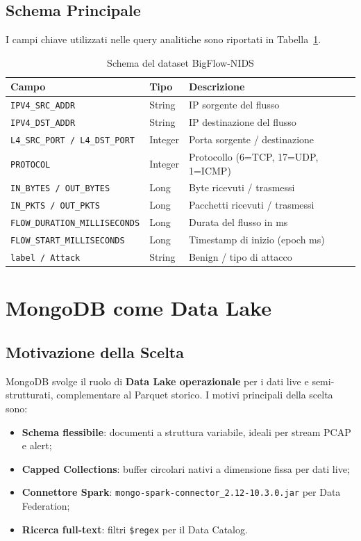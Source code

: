 \documentclass[10pt,a4paper]{article}
\begin{document}
\subsection{Schema Principale}
I campi chiave utilizzati nelle query analitiche sono riportati in
Tabella~\ref{tab:schema}.

\begin{table}[H]
\centering
\small
\begin{tabularx}{\textwidth}{@{}llX@{}}
\toprule
\textbf{Campo} & \textbf{Tipo} & \textbf{Descrizione} \\
\midrule
\texttt{IPV4\_SRC\_ADDR}              & String  & IP sorgente del flusso \\
\texttt{IPV4\_DST\_ADDR}              & String  & IP destinazione del flusso \\
\texttt{L4\_SRC\_PORT / L4\_DST\_PORT}& Integer & Porta sorgente / destinazione \\
\texttt{PROTOCOL}                     & Integer & Protocollo (6=TCP, 17=UDP, 1=ICMP) \\
\texttt{IN\_BYTES / OUT\_BYTES}        & Long    & Byte ricevuti / trasmessi \\
\texttt{IN\_PKTS / OUT\_PKTS}          & Long    & Pacchetti ricevuti / trasmessi \\
\texttt{FLOW\_DURATION\_MILLISECONDS}  & Long    & Durata del flusso in ms \\
\texttt{FLOW\_START\_MILLISECONDS}     & Long    & Timestamp di inizio (epoch ms) \\
\texttt{label / Attack}               & String  & Benign / tipo di attacco \\
\bottomrule
\end{tabularx}
\caption{Schema del dataset BigFlow-NIDS}
\label{tab:schema}
\end{table}

\section{MongoDB come Data Lake}

\subsection{Motivazione della Scelta}
MongoDB svolge il ruolo di \textbf{Data Lake operazionale} per i dati live e semi-strutturati,
complementare al Parquet storico. I motivi principali della scelta sono:
\begin{itemize}[noitemsep]
  \item \textbf{Schema flessibile}: documenti a struttura variabile, ideali per stream PCAP e alert;
  \item \textbf{Capped Collections}: buffer circolari nativi a dimensione fissa per dati live;
  \item \textbf{Connettore Spark}: \texttt{mongo-spark-connector\_2.12-10.3.0.jar} per Data Federation;
  \item \textbf{Ricerca full-text}: filtri \texttt{\$regex} per il Data Catalog.
\end{itemize}
\end{document}
